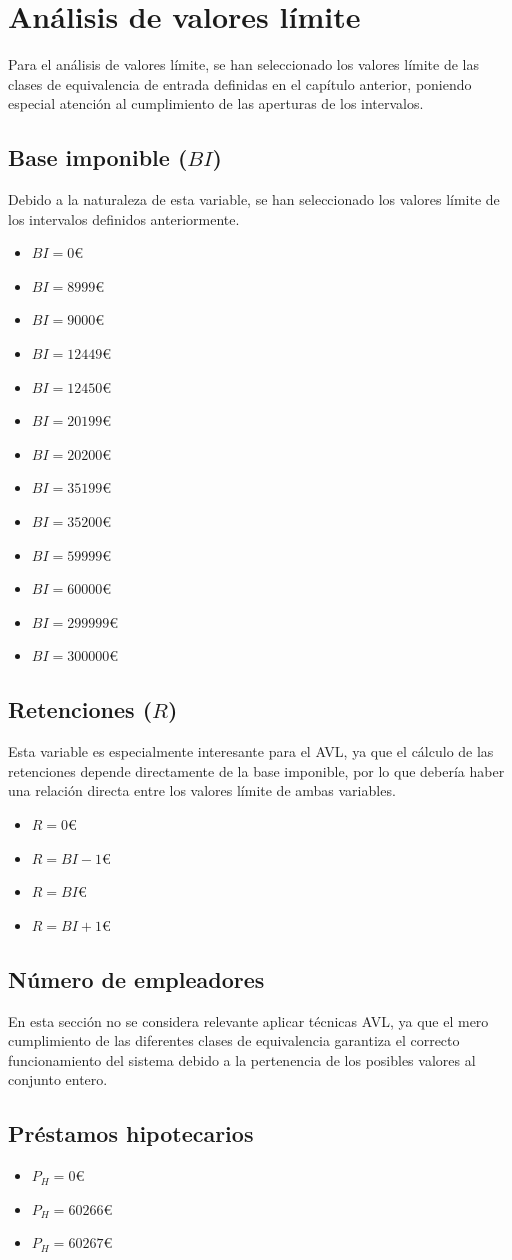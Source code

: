 \chapter{Análisis de valores límite}
Para el análisis de valores límite, se han seleccionado los valores límite de las clases de equivalencia
de entrada definidas en el capítulo anterior, poniendo especial atención al cumplimiento de las aperturas
de los intervalos.

\section{Base imponible ($BI$)}
Debido a la naturaleza de esta variable, se han seleccionado los valores límite de los intervalos definidos
anteriormente.
\begin{itemize}
	\item $BI = 0$€
	\item $BI = 8999$€
	\item $BI = 9000$€
	\item $BI = 12449$€
	\item $BI = 12450$€
	\item $BI = 20199$€
	\item $BI = 20200$€
	\item $BI = 35199$€
	\item $BI = 35200$€
	\item $BI = 59999$€
	\item $BI = 60000$€
	\item $BI = 299999$€
	\item $BI = 300000$€
\end{itemize}
\newpage{}
\section{Retenciones ($R$)}
Esta variable es especialmente interesante para el AVL, ya que el cálculo de las retenciones depende
directamente de la base imponible, por lo que debería haber una relación directa entre los valores límite
de ambas variables.
\begin{itemize}
	\item $R = 0$€
	\item $R = BI - 1$€
	\item $R = BI$€
	\item $R = BI + 1$€
\end{itemize}

\section{Número de empleadores}
En esta sección no se considera relevante aplicar técnicas AVL, ya que el mero cumplimiento de las
diferentes clases de equivalencia garantiza el correcto funcionamiento del sistema debido a la pertenencia de
los posibles valores al conjunto entero.

\section{Préstamos hipotecarios}
\begin{itemize}
	\item $P_{H} = 0$€
	\item $P_{H} = 60266$€
	\item $P_{H} = 60267$€
\end{itemize}
